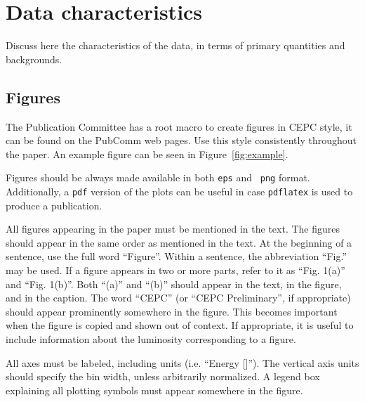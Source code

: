\documentclass[11pt,a4paper]{cepcnote}
\begin{document}
%
%
\section{Data characteristics}

Discuss here the characteristics of the data, in terms of
primary quantities and backgrounds.

\subsection{Figures}

The Publication Committee has a root macro to create figures in
CEPC style, it can be found on the PubComm web pages.
Use this style consistently throughout the paper.
An example figure can be seen in Figure~\ref{fig:example}. 

%
Figures should be always made available in both {\tt eps} and {\tt
  png} format. Additionally, a {\tt pdf} version of the plots can be
useful in case \verb|pdflatex| is used to produce a publication.

All figures appearing in the paper must be mentioned in the text.
The figures should appear in the same order as mentioned in the text.
At the beginning of a sentence, use the full word ``Figure''.
Within a sentence, the abbreviation ``Fig.'' may be used.
If a figure appears in two or more parts, refer to it as
``Fig. 1(a)'' and ``Fig. 1(b)''. Both ``(a)'' and ``(b)'' should
appear in the text, in the figure, and in the caption.
The word ``CEPC'' (or ``CEPC Preliminary'', if appropriate) should
appear prominently somewhere in the figure. This becomes important when
the figure is copied and shown out of context. If appropriate, it
is useful to include information about the luminosity corresponding
to a figure.

All axes must be labeled, including units (i.e. ``Energy [\gev]'').
The vertical axis units should specify the bin width, unless
arbitrarily normalized. A legend box explaining all plotting symbols
must appear somewhere in the figure.
\end{document}
